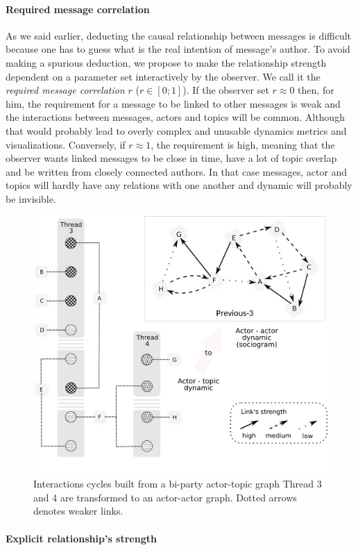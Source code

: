 \documentclass[a4paper,twoside]{article}
\begin{document}
\paragraph{Required message correlation}

As we said earlier, deducting the causal relationship between messages is difficult because one has to guess what is the real intention of message's author.  To avoid making a spurious deduction, we propose to make the relationship strength dependent on a parameter set interactively by the observer.  We call it the \emph{required message correlation} $r$ ($r\in[0;1]$).  If the observer set $r \approx 0$ then, for him, the requirement for a message to be linked to other messages is weak and the interactions between messages, actors and topics will be common.  Although that would probably lead to overly complex and unusable dynamics metrics and visualizations.  Conversely, if $r\approx 1$, the requirement is high, meaning that the observer wants linked messages to be close in time, have a lot of topic overlap and be written from closely connected authors.  In that case messages, actor and topics will hardly have any relations with one another and dynamic will probably be invisible.

\begin{figure}[t]
 \includegraphics[width=.5\textwidth]{images/cycles.png}
 \small{
  \caption{\label{fig:cycles}
   Interactions cycles built from a bi-party actor-topic graph Thread 3 and 4 are transformed to an actor-actor graph.  Dotted arrows denotes weaker links.
  }}
\end{figure}
 

\paragraph{Explicit relationship's strength}

\end{document}
